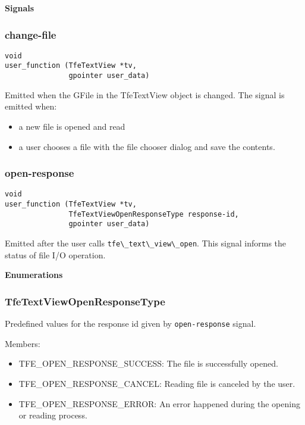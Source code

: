 \textbf{Signals}

\subsubsection{change-file}\label{change-file}

\begin{lstlisting}
void
user_function (TfeTextView *tv,
               gpointer user_data)
\end{lstlisting}

Emitted when the GFile in the TfeTextView object is changed. The signal
is emitted when:

\begin{itemize}
\tightlist
\item
  a new file is opened and read
\item
  a user chooses a file with the file chooser dialog and save the
  contents.
\end{itemize}

\subsubsection{open-response}\label{open-response}

\begin{lstlisting}
void
user_function (TfeTextView *tv,
               TfeTextViewOpenResponseType response-id,
               gpointer user_data)
\end{lstlisting}

Emitted after the user calls
\passthrough{\lstinline!tfe\_text\_view\_open!}. This signal informs the
status of file I/O operation.

\textbf{Enumerations}

\subsubsection{TfeTextViewOpenResponseType}\label{tfetextviewopenresponsetype}

Predefined values for the response id given by
\passthrough{\lstinline!open-response!} signal.

Members:

\begin{itemize}
\tightlist
\item
  TFE\_OPEN\_RESPONSE\_SUCCESS: The file is successfully opened.
\item
  TFE\_OPEN\_RESPONSE\_CANCEL: Reading file is canceled by the user.
\item
  TFE\_OPEN\_RESPONSE\_ERROR: An error happened during the opening or
  reading process.
\end{itemize}
